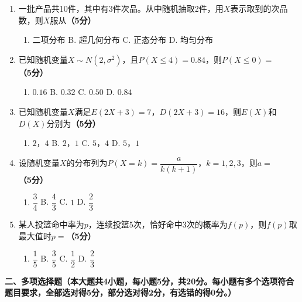 \documentclass[12pt, a4paper]{ctexart}
\newcommand{\score}[1]{\hfill\textbf{（#1分）}}
\begin{document}
\begin{enumerate}[label=\textbf{\arabic*.}, leftmargin=2em]
\item 一批产品共10件，其中有3件次品。从中随机抽取2件，用$X$表示取到的次品数，则$X$服从\score{5}
\begin{enumerate}[label=\Alph*., leftmargin=2em]
\item 二项分布 \quad B. 超几何分布 \quad C. 正态分布 \quad D. 均匀分布
\end{enumerate}

\item 已知随机变量$X \sim N(2, \sigma^2)$，且$P(X \leqslant 4) = 0.84$，则$P(X \leqslant 0)=$\score{5}
\begin{enumerate}[label=\Alph*., leftmargin=2em]
\item $0.16$ \quad B. $0.32$ \quad C. $0.50$ \quad D. $0.84$
\end{enumerate}

\item 已知随机变量$X$满足$E(2X+3) = 7$，$D(2X+3) = 16$，则$E(X)$和$D(X)$分别为\score{5}
\begin{enumerate}[label=\Alph*., leftmargin=2em]
\item $2$，$4$ \quad B. $2$，$1$ \quad C. $5$，$4$ \quad D. $5$，$1$
\end{enumerate}

\item 设随机变量$X$的分布列为$P(X=k) = \dfrac{a}{k(k+1)}$，$k=1,2,3$，则$a=$\score{5}
\begin{enumerate}[label=\Alph*., leftmargin=2em]
\item $\dfrac{3}{4}$ \quad B. $\dfrac{4}{3}$ \quad C. $1$ \quad D. $\dfrac{2}{3}$
\end{enumerate}

\item 某人投篮命中率为$p$，连续投篮5次，恰好命中3次的概率为$f(p)$，则$f(p)$取最大值时$p=$\score{5}
\begin{enumerate}[label=\Alph*., leftmargin=2em]
\item $\dfrac{1}{5}$ \quad B. $\dfrac{3}{5}$ \quad C. $\dfrac{1}{2}$ \quad D. $\dfrac{2}{3}$
\end{enumerate}

\end{enumerate}

\vspace{0.5cm}

\noindent\textbf{二、多项选择题（本大题共4小题，每小题5分，共20分。每小题有多个选项符合题目要求，全部选对得5分，部分选对得2分，有选错的得0分。）}

\vspace{0.3cm}
\end{document}
